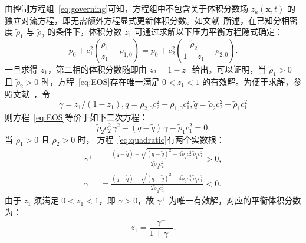 \documentclass[12pt,a4paper]{article}
\numberwithin{equation}{section}    %
\begin{document}

由控制方程组~\eqref{eq:governing}可知，方程组中不包含关于体积分数场 $z_k(\bm{x}, t)$ 的独立对流方程，即无需额外方程显式更新体积分数。如文献~\cite{grenier2013accurate}所述，在已知分相密度 $\tilde{\rho}_1$ 与 $\tilde{\rho}_2$ 的条件下，体积分数 $z_1$ 可通过求解以下压力平衡方程隐式确定：
\begin{equation}
    \label{eq:EOS}
    p_0 + c_1^2 \left( \frac{\tilde{\rho}_1}{z_1} - \rho_{1,0} \right)
    = p_0 + c_2^2 \left( \frac{\tilde{\rho}_2}{1 - z_1} - \rho_{2,0} \right).
\end{equation}
一旦求得 $z_1$，第二相的体积分数随即由 $z_2 = 1 - z_1$ 给出。可以证明，当 $\tilde{\rho}_1 > 0$ 且 $\tilde{\rho}_2 > 0$ 时，方程~\eqref{eq:EOS}存在唯一满足 $0 < z_1 < 1$ 的有效解。为便于求解，参照文献~\cite{Chanteperdrix2004}，令 
\begin{equation}
    \gamma = z_1 / (1 - z_1), q = \rho_{2,0} c_2^2 - \rho_{1,0} c_1^2,\tilde{q} = \tilde{\rho}_2 c_2^2 - \tilde{\rho}_1 c_1^2
\end{equation}
则方程~\eqref{eq:EOS}等价于如下二次方程：
\begin{equation}
    \label{eq:quadratic}
    \tilde{\rho}_2 c_2^2\, \gamma^2 - (q - \tilde{q})\,\gamma
    - \tilde{\rho}_1 c_1^2 = 0.
\end{equation}
当 $\tilde{\rho}_1 > 0$ 且 $\tilde{\rho}_2 > 0$ 时，
方程~\eqref{eq:quadratic}有两个实数根：
\begin{equation}
    \begin{aligned}
        \gamma^+ & = \frac{(q - \tilde{q})
            + \sqrt{(q - \tilde{q})^2 + 4\tilde{\rho}_2 c_2^2\,\tilde{\rho}_1 c_1^2}}
            {2\tilde{\rho}_2 c_2^2} > 0, \\[4pt]
        \gamma^- & = \frac{(q - \tilde{q})
            - \sqrt{(q - \tilde{q})^2 + 4\tilde{\rho}_2 c_2^2\,\tilde{\rho}_1 c_1^2}}
            {2\tilde{\rho}_2 c_2^2} < 0.
    \end{aligned}
\end{equation}
由于 $z_1$ 须满足 $0 < z_1 < 1$，即 $\gamma > 0$，故 $\gamma^+$
为唯一有效解，对应的平衡体积分数为：
\begin{equation}
    z_1 = \frac{\gamma^+}{1 + \gamma^+}.
\end{equation}
\end{document}
